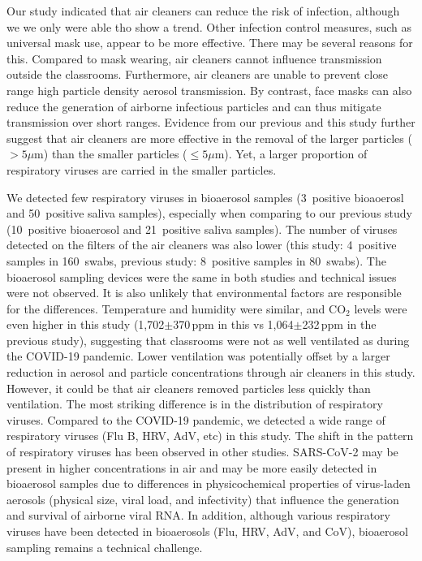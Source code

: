 \documentclass[fleqn,11pt]{wlscirep}
\begin{document}

Our study indicated that air cleaners can reduce the risk of infection, although we we only were able tho show a trend. Other infection control measures, such as universal mask use, appear to be more effective\cite{Banholzer2023PLoSMed,Heinsohn2022,Gettings2021}. There may be several reasons for this. Compared to \eg mask wearing, air cleaners cannot influence transmission outside the classrooms. Furthermore, air cleaners are unable to prevent close range high particle density aerosol transmission. By contrast, face masks can also reduce the generation of airborne infectious particles and can thus mitigate transmission over short ranges. Evidence from our previous\cite{Banholzer2023PLoSMed} and this study further suggest that air cleaners are more effective in the removal of the larger particles ($>5\mu$m) than the smaller particles ($\leq5\mu$m). Yet, a larger proportion of respiratory viruses are carried in the smaller particles\cite{Fennelly2020}. 


We detected few respiratory viruses in bioaerosol samples (3~positive bioaoerosl and 50~positive saliva samples), especially when comparing to our previous study\cite{Banholzer2023PLoSMed} (10~positive bioaerosol and 21~positive saliva samples). The number of viruses detected on the filters of the air cleaners was also lower (this study: 4~positive samples in 160~swabs, previous study: 8~positive samples in 80~swabs). The bioaerosol sampling devices were the same in both studies and technical issues were not observed. It is also unlikely that environmental factors are responsible for the differences. Temperature and humidity were similar, and CO$_2$ levels were even higher in this study (1,702$\pm$370\,ppm in this vs 1,064$\pm$232\,ppm in the previous study), suggesting that classrooms were not as well ventilated as during the COVID-19 pandemic. Lower ventilation was potentially offset by a larger reduction in aerosol and particle concentrations through air cleaners in this study. However, it could be that air cleaners removed particles less quickly than ventilation. The most striking difference is in the distribution of respiratory viruses. Compared to the COVID-19 pandemic, we detected a wide range of respiratory viruses (Flu B, HRV, AdV, etc) in this study. The shift in the pattern of respiratory viruses has been observed in other studies\cite{Nygaard2023Lancet,Sauteur2022EuroSurv}. SARS-CoV-2 may be present in higher concentrations in air and may be more easily detected in bioaerosol samples due to differences in physicochemical properties of virus-laden aerosols (\eg physical size, viral load, and infectivity) that influence the generation and survival of airborne viral RNA\cite{Wang2021,Sattar2016Book}. In addition, although various respiratory viruses have been detected in bioaerosols (\eg Flu\cite{Bischoff2013JID,Pan2017mSphere}, HRV\cite{Myatt2004AJRCCM,Fabian2011JAMPDD}, AdV\cite{Nguyen2017OFID,Pan2017mSphere}, and CoV\cite{Guo2020EID,Liu2020Nature}), bioaerosol sampling remains a technical challenge\cite{Wang2021 ,Belser2023PLOSPath,Bekking2019IORV,Mainelis2020AST}. 
\end{document}
